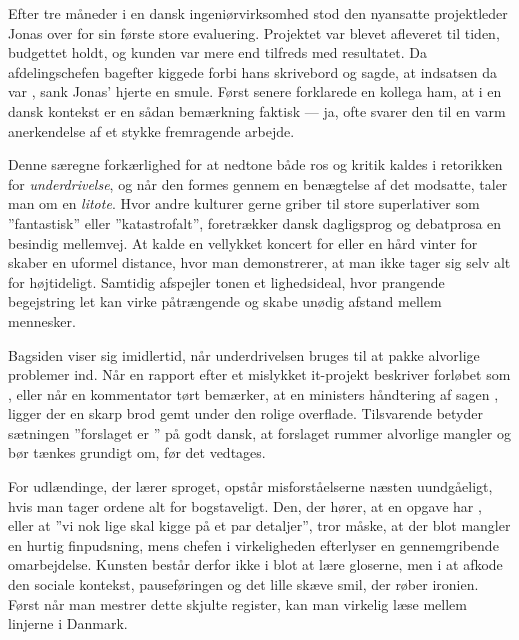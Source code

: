 Efter tre måneder i en dansk ingeniørvirksomhed stod den nyansatte projektleder Jonas over for sin første store evaluering. Projektet var blevet afleveret til tiden, budgettet holdt, og kunden var mere end tilfreds med resultatet. Da afdelingschefen bagefter kiggede forbi hans skrivebord og sagde, at indsatsen da var , sank Jonas' hjerte en smule. Først senere forklarede en kollega ham, at i en dansk kontekst er en sådan bemærkning faktisk  --- ja, ofte svarer den til en varm anerkendelse af et stykke fremragende arbejde.

Denne særegne forkærlighed for at nedtone både ros og kritik kaldes i retorikken for \textit{underdrivelse}, og når den formes gennem en benægtelse af det modsatte, taler man om en \textit{litote}. Hvor andre kulturer gerne griber til store superlativer som ”fantastisk” eller ”katastrofalt”, foretrækker dansk dagligsprog og debatprosa en besindig mellemvej. At kalde en vellykket koncert for  eller en hård vinter for  skaber en uformel distance, hvor man demonstrerer, at man ikke tager sig selv alt for højtideligt. Samtidig afspejler tonen et lighedsideal, hvor prangende begejstring let kan virke påtrængende og skabe unødig afstand mellem mennesker.

Bagsiden viser sig imidlertid, når underdrivelsen bruges til at pakke alvorlige problemer ind. Når en rapport efter et mislykket it-projekt beskriver forløbet som , eller når en kommentator tørt bemærker, at en ministers håndtering af sagen , ligger der en skarp brod gemt under den rolige overflade. Tilsvarende betyder sætningen ”forslaget er ” på godt dansk, at forslaget rummer alvorlige mangler og bør tænkes grundigt om, før det vedtages.

For udlændinge, der lærer sproget, opstår misforståelserne næsten uundgåeligt, hvis man tager ordene alt for bogstaveligt. Den, der hører, at en opgave har , eller at ”vi nok lige skal kigge på et par detaljer”, tror måske, at der blot mangler en hurtig finpudsning, mens chefen i virkeligheden efterlyser en gennemgribende omarbejdelse. Kunsten består derfor ikke i blot at lære gloserne, men i at afkode den sociale kontekst, pauseføringen og det lille skæve smil, der røber ironien. Først når man mestrer dette skjulte register, kan man virkelig læse mellem linjerne i Danmark.

